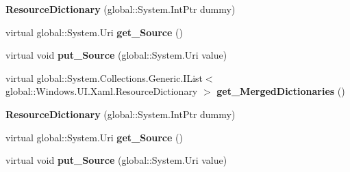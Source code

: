 \begin{DoxyCompactItemize}
\item 
\mbox{\label{class_windows_1_1_u_i_1_1_xaml_1_1_resource_dictionary_a0cbfb902f5ff2e6c1f1eb1afb0bca04c}} 
{\bfseries Resource\+Dictionary} (global\+::\+System.\+Int\+Ptr dummy)
\item 
\mbox{\label{class_windows_1_1_u_i_1_1_xaml_1_1_resource_dictionary_a8377dec4bb445706e6660da622358e2f}} 
virtual global\+::\+System.\+Uri {\bfseries get\+\_\+\+Source} ()
\item 
\mbox{\label{class_windows_1_1_u_i_1_1_xaml_1_1_resource_dictionary_aa192ade6e6b72c6129bf8ff27c6be96f}} 
virtual void {\bfseries put\+\_\+\+Source} (global\+::\+System.\+Uri value)
\item 
\mbox{\label{class_windows_1_1_u_i_1_1_xaml_1_1_resource_dictionary_ae4c33952a20ac36d63cbc631d1198e6a}} 
virtual global\+::\+System.\+Collections.\+Generic.\+I\+List$<$ global\+::\+Windows.\+U\+I.\+Xaml.\+Resource\+Dictionary $>$ {\bfseries get\+\_\+\+Merged\+Dictionaries} ()
\item 
\mbox{\label{class_windows_1_1_u_i_1_1_xaml_1_1_resource_dictionary_a0cbfb902f5ff2e6c1f1eb1afb0bca04c}} 
{\bfseries Resource\+Dictionary} (global\+::\+System.\+Int\+Ptr dummy)
\item 
\mbox{\label{class_windows_1_1_u_i_1_1_xaml_1_1_resource_dictionary_a8377dec4bb445706e6660da622358e2f}} 
virtual global\+::\+System.\+Uri {\bfseries get\+\_\+\+Source} ()
\item 
\mbox{\label{class_windows_1_1_u_i_1_1_xaml_1_1_resource_dictionary_aa192ade6e6b72c6129bf8ff27c6be96f}} 
virtual void {\bfseries put\+\_\+\+Source} (global\+::\+System.\+Uri value)
\item 
\mbox{\label{class_windows_1_1_u_i_1_1_xaml_1_1_resource_dictionary_ae4c33952a20ac36d63cbc631d1198e6a}} 

\end{DoxyCompactItemize}
